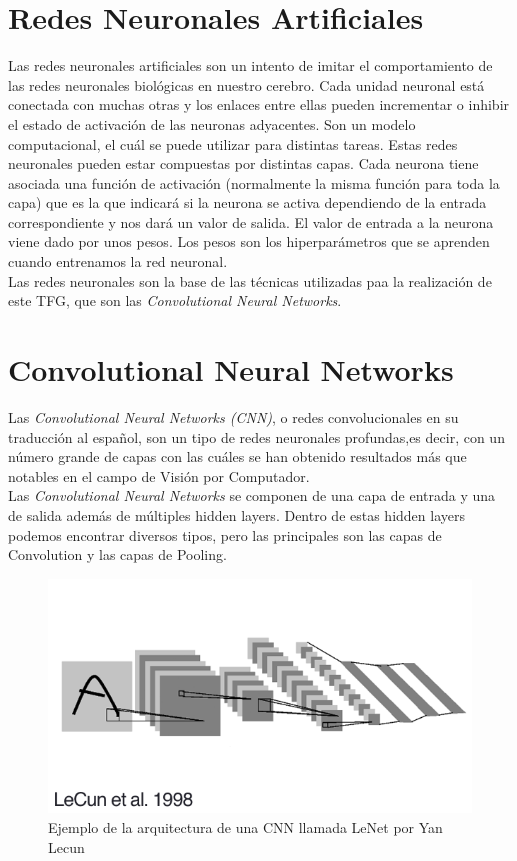 
\section{Redes Neuronales Artificiales} 
\label{RedesNeuronales}
Las redes neuronales artificiales son un intento de imitar el comportamiento de las redes neuronales biológicas en nuestro cerebro.
Cada unidad neuronal está conectada con muchas otras y los enlaces entre ellas pueden incrementar o inhibir el estado de activación de las neuronas adyacentes. Son un modelo computacional, el cuál se puede utilizar para distintas tareas. Estas redes neuronales pueden estar compuestas por distintas capas. Cada neurona tiene asociada una función de activación (normalmente la misma función para toda la capa) que es la que indicará si la neurona se activa dependiendo de la entrada correspondiente y nos dará un valor de salida. El valor de entrada a la neurona viene dado por unos pesos. Los pesos son los hiperparámetros que se aprenden cuando entrenamos la red neuronal.\\

Las redes neuronales son la base de las técnicas utilizadas paa la realización de este TFG, que son las \textit{Convolutional Neural Networks}.

\section{Convolutional Neural Networks}
\label{CNN}
Las \textit{Convolutional Neural Networks (CNN)}, o redes convolucionales en su traducción al español, son un tipo de redes neuronales profundas,es decir, con un número grande de capas con las cuáles se han obtenido resultados más que notables en el campo de Visión por Computador.\\

Las \textit{Convolutional Neural Networks} se componen de una capa de entrada y una de salida además de múltiples hidden layers. Dentro de estas hidden layers podemos encontrar diversos tipos, pero las principales son las capas de Convolution y las capas de Pooling.

\begin{figure}[H]
	\centering
	\caption{Ejemplo de la arquitectura de una CNN llamada LeNet  por Yan Lecun \cite{Lecun98gradient-basedlearning}}
	\includegraphics[width=\textwidth]{./imagenes/lenet.png}
\end{figure}

